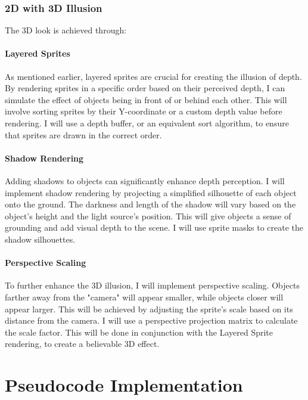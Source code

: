 \documentclass{article}
\begin{document}
\subsubsection{2D with 3D Illusion}

The 3D look is achieved through:

\paragraph{Layered Sprites}
As mentioned earlier, layered sprites are crucial for creating the illusion of depth. By rendering sprites in a specific order based on their perceived depth, I can simulate the effect of objects being in front of or behind each other. This will involve sorting sprites by their Y-coordinate or a custom depth value before rendering. I will use a depth buffer, or an equivalent sort algorithm, to ensure that sprites are drawn in the correct order.

\paragraph{Shadow Rendering}
Adding shadows to objects can significantly enhance depth perception. I will implement shadow rendering by projecting a simplified silhouette of each object onto the ground. The darkness and length of the shadow will vary based on the object's height and the light source's position. This will give objects a sense of grounding and add visual depth to the scene. I will use sprite masks to create the shadow silhouettes.

\paragraph{Perspective Scaling}
To further enhance the 3D illusion, I will implement perspective scaling. Objects farther away from the "camera" will appear smaller, while objects closer will appear larger. This will be achieved by adjusting the sprite's scale based on its distance from the camera. I will use a perspective projection matrix to calculate the scale factor. This will be done in conjunction with the Layered Sprite rendering, to create a believable 3D effect.

\section{Pseudocode Implementation}
\end{document}
